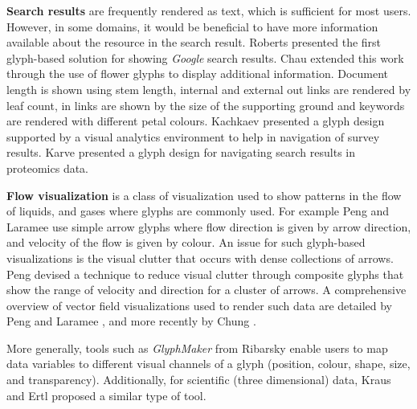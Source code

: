 \textbf{Search results} are frequently rendered as text, which is sufficient for most users. However, in some domains, it would be beneficial to have more information available about the resource in the search result. 
Roberts \etal \cite{roberts2002multiform} presented the first glyph-based solution for showing \emph{Google} search results.
Chau \cite{chau2011visualizing} extended this work through the use of flower glyphs to display additional information.
Document length is shown using stem length, internal and external out links are rendered by leaf count, in links are shown by the size of the supporting ground and keywords are rendered with different petal colours.
Kachkaev \etal \cite{kachkaev2014} presented a glyph design supported by a visual analytics environment to help in navigation of survey results.
Karve \cite{Karve07} presented a glyph design for navigating search results in proteomics data. 

\textbf{Flow visualization} is a class of visualization used to show patterns in the flow of liquids, and gases where glyphs are commonly used.
For example Peng and Laramee \cite{peng2008vector} use simple arrow glyphs where flow direction is given by arrow direction, and velocity of the flow is given by colour.
An issue for such glyph-based visualizations is the visual clutter that occurs with dense collections of arrows.
Peng \etal \cite{peng2012mesh} devised a technique to reduce visual clutter through composite glyphs that show the range of velocity and direction for a cluster of arrows.
A comprehensive overview of vector field visualizations used to render such data are detailed by Peng and Laramee \cite{peng2009higher}, and more recently by Chung \etal \cite{chung2014glyph}.


More generally, tools such as \emph{GlyphMaker} from Ribarsky \etal \cite{ribarsky94} enable users to map data variables to different visual channels of a glyph (position, colour, shape, size, and transparency).
Additionally, for scientific (three dimensional) data, Kraus and Ertl \cite{Kraust01} proposed a similar type of tool.
